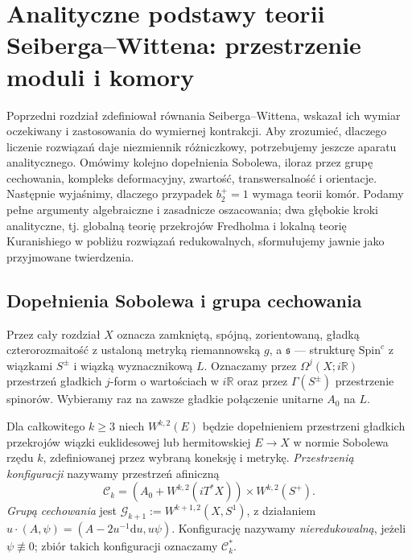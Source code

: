 \chapter{Analityczne podstawy teorii Seiberga--Wittena: przestrzenie moduli i komory}
\label{ch:tg-sw-analiza}

Poprzedni rozdział zdefiniował równania Seiberga--Wittena, wskazał ich
wymiar oczekiwany i zastosowania do wymiernej kontrakcji. Aby zrozumieć,
dlaczego liczenie rozwiązań daje niezmiennik różniczkowy, potrzebujemy
jeszcze aparatu analitycznego. Omówimy kolejno dopełnienia Sobolewa,
iloraz przez grupę cechowania, kompleks deformacyjny, zwartość,
transwersalność i orientacje. Następnie wyjaśnimy, dlaczego przypadek
$b_2^+=1$ wymaga teorii komór. Podamy pełne argumenty algebraiczne
i zasadnicze oszacowania; dwa głębokie kroki analityczne, tj. globalną
teorię przekrojów Fredholma i lokalną teorię Kuranishiego w pobliżu
rozwiązań redukowalnych, sformułujemy jawnie jako przyjmowane twierdzenia.

\section{Dopełnienia Sobolewa i grupa cechowania}
\label{sec:tg-sw-sobolev}

Przez cały rozdział $X$ oznacza zamkniętą, spójną, zorientowaną,
gładką czterorozmaitość z ustaloną metryką riemannowską $g$,
a $\mathfrak s$ --- strukturę $\mathrm{Spin}^c$ z wiązkami $S^\pm$
i wiązką wyznacznikową $L$. Oznaczamy przez
$\Omega^j(X;i\mathbb R)$ przestrzeń gładkich $j$-form o wartościach
w $i\mathbb R$ oraz przez $\Gamma(S^\pm)$ przestrzenie spinorów.
Wybieramy raz na zawsze gładkie połączenie unitarne $A_0$ na $L$.

\begin{definicja}
Dla całkowitego $k\geq3$ niech $W^{k,2}(E)$ będzie dopełnieniem
przestrzeni gładkich przekrojów wiązki euklidesowej lub hermitowskiej
$E\to X$ w normie Sobolewa rzędu $k$, zdefiniowanej przez
wybraną koneksję i metrykę. \emph{Przestrzenią konfiguracji} nazywamy
przestrzeń afiniczną
\[
\mathcal C_k=(A_0+W^{k,2}(iT^*X))\times W^{k,2}(S^+).
\]
\emph{Grupą cechowania} jest $\mathcal G_{k+1}:=W^{k+1,2}(X,S^1)$,
z działaniem $u\cdot(A,\psi)=(A-2u^{-1}\mathrm du,u\psi)$.
Konfigurację nazywamy \emph{nieredukowalną}, jeżeli
$\psi\not\equiv0$; zbiór takich konfiguracji oznaczamy
$\mathcal C_k^*$.
\end{definicja}

